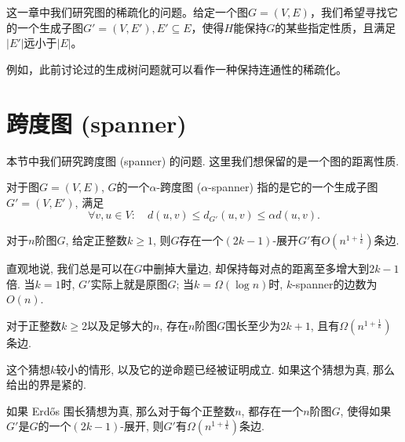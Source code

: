 \providecommand\numberthis{\addtocounter{equation}{1}\tag{\theequation}}



这一章中我们研究图的稀疏化的问题。给定一个图$G=(V,E)$，我们希望寻找它的一个生成子图$G'=(V,E'),E'\subseteq E$，使得$H$能保持$G$的某些指定性质，且满足$|E'|$远小于$|E|$。

例如，此前讨论过的生成树问题就可以看作一种保持连通性的稀疏化。




\section{跨度图 (spanner)}

本节中我们研究跨度图 (spanner) 的问题. 这里我们想保留的是一个图的距离性质.

\begin{definition}
    对于图$G=(V,E)$, $G$的一个$\alpha$-跨度图 ($\alpha$-spanner) 指的是它的一个生成子图$G'=(V,E')$, 满足
    \[
    \forall v,u\in V:\quad d(u,v)\le d_{G'}(u,v)\leq\alpha d(u,v).
    \]
\end{definition}

\begin{theorem}
\label{thm:multiplicative spanner}
    对于$n$阶图$G$, 给定正整数$k\ge 1$, 则$G$存在一个$(2k-1)$-展开$G'$有$O(n^{1
    +\frac{1}{k}})$条边.
\end{theorem}

直观地说, 我们总是可以在$G$中删掉大量边, 却保持每对点的距离至多增大到$2k-1$倍. 当$k=1$时, $G'$实际上就是原图$G$; 当$k=\Omega(\log n)$时, $k$-spanner的边数为$O(n)$.

\begin{conjecture}
    对于正整数$k\ge 2$以及足够大的$n$, 存在$n$阶图$G$围长至少为$2k+1$, 且有$\Omega(n^{1+\frac{1}{k}})$条边.
\end{conjecture}

这个猜想$k$较小的情形, 以及它的逆命题已经被证明成立. 如果这个猜想为真, 那么  给出的界是紧的.

\begin{claim}
    如果 Erdős 围长猜想为真, 那么对于每个正整数$n$, 都存在一个$n$阶图$G$, 使得如果$G'$是$G$的一个$(2k-1)$-展开, 则$G'$有$\Omega(n^{1+\frac{1}{k}})$条边.
\end{claim}

